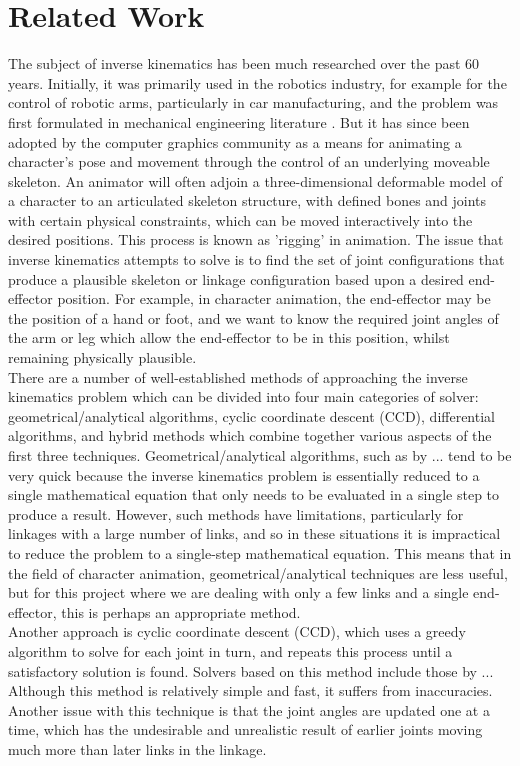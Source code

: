 \documentclass[paper=a4, fontsize=11pt]{scrartcl} %
\numberwithin{equation}{section} %
\numberwithin{figure}{section} %
\numberwithin{table}{section} %
\begin{document}
\section{Related Work}
The subject of inverse kinematics has been much researched over the past 60 years. Initially, it was primarily used in the robotics industry, for example for the control of robotic arms, particularly in car manufacturing, and the problem was first formulated in mechanical engineering literature \cite{Crai55}. But it has since been adopted by the computer graphics community as a means for animating a character's pose and movement through the control of an underlying moveable skeleton. An animator will often adjoin a three-dimensional deformable model of a character to an articulated skeleton structure, with defined bones and joints with certain physical constraints, which can be moved interactively into the desired positions. This process is known as 'rigging' in animation. The issue that inverse kinematics attempts to solve is to find the set of joint configurations that produce a plausible skeleton or linkage configuration based upon a desired end-effector position. For example, in character animation, the end-effector may be the position of a hand or foot, and we want to know the required joint angles of the arm or leg which allow the end-effector to be in this position, whilst remaining physically plausible. \\

There are a number of well-established methods of approaching the inverse kinematics problem which can be divided into four main categories of solver: geometrical/analytical algorithms, cyclic coordinate descent (CCD), differential algorithms, and hybrid methods which combine together various aspects of the first three techniques. Geometrical/analytical algorithms, such as by ... tend to be very quick because the inverse kinematics problem is essentially reduced to a single mathematical equation that only needs to be evaluated in a single step to produce a result. However, such methods have limitations, particularly for linkages with a large number of links, and so in these situations it is impractical to reduce the problem to a single-step mathematical equation. This means that in the field of character animation, geometrical/analytical techniques are less useful, but for this project where we are dealing with only a few links and a single end-effector, this is perhaps an appropriate method. \\

Another approach is cyclic coordinate descent (CCD), which uses a greedy algorithm to solve for each joint in turn, and repeats this process until a satisfactory solution is found. Solvers based on this method include those by ... Although this method is relatively simple and fast, it suffers from inaccuracies. Another issue with this technique is that the joint angles are updated one at a time, which has the undesirable and unrealistic result of earlier joints moving much more than later links in the linkage. \\
\end{document}

